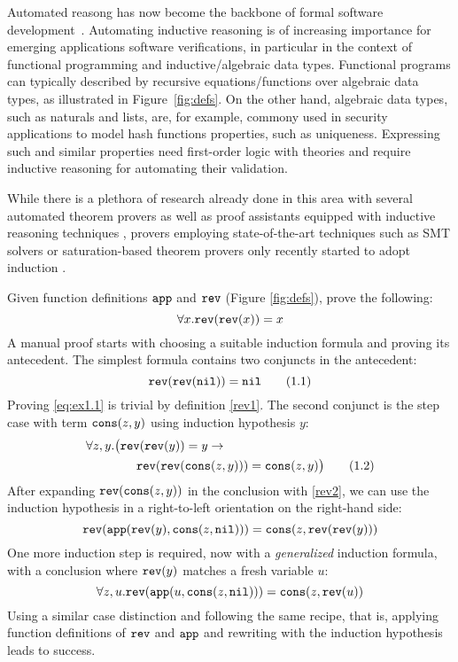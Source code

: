 Automated reasong has now become the backbone of formal software development~\cite{CAV18Cook}. Automating inductive reasoning is of increasing  importance for emerging applications software verifications, in particular in the context of functional programming and inductive/algebraic data types.
Functional programs can typically described by 
recursive equations/functions over algebraic data types, as illustrated in Figure~\ref{fig:defs}.  On the other hand, algebraic data types, such as naturals and lists, are, for example, commony used in security applications to model hash functions properties, such as uniqueness. Expressing such and similar properties need  first-order logic with theories and require inductive reasoning for automating their validation. 


While there is a plethora of research already done in this area \cite{bundychapter,mooreindutionhistory} with several automated theorem provers as well as proof assistants equipped with inductive reasoning techniques \cite{acl,aclhandbook,inka,oyster}, provers employing state-of-the-art techniques such as SMT solvers or saturation-based theorem provers only recently started to adopt induction \cite{cruanes,vampireinduction,smtinduction}. 

\begin{example}\label{ex:1}
Given function definitions $\mathtt{app}$ and $\mathtt{rev}$ (Figure \ref{fig:defs}), prove the following:
$$\forall x. \mathtt{rev}(\mathtt{rev}(x))=x$$
A manual proof starts with choosing a suitable induction formula and proving its antecedent. The simplest formula contains two conjuncts in the antecedent:
\begin{equation}\label{eq:ex1.1}\mathtt{rev}(\mathtt{rev}(\mathtt{nil})) = \mathtt{nil}\tag{1.1}\end{equation}
Proving \eqref{eq:ex1.1} is trivial by definition \eqref{rev1}. The second conjunct is the step case with term $\mathtt{cons}(z,y)$ using induction hypothesis $y$:
\begin{align}\forall z,y.\big(\mathtt{rev}(\mathtt{rev}(y))&=y\rightarrow\nonumber\\\mathtt{rev}(\mathtt{rev}(&\mathtt{cons}(z,y)))=\mathtt{cons}(z,y)\big)\label{eq:ex1.2}\tag{1.2}\end{align}
After expanding $\mathtt{rev}(\mathtt{cons}(z,y))$ in the conclusion with \eqref{rev2}, we can use the induction hypothesis in a right-to-left orientation on the right-hand side:
$$\mathtt{rev}(\mathtt{app}(\mathtt{rev}(y),\mathtt{cons}(z,\mathtt{nil})))=\mathtt{cons}(z,\mathtt{rev}(\mathtt{rev}(y)))$$
One more induction step is required, now with a \textit{generalized} induction formula, with a conclusion where $\mathtt{rev}(y)$ matches a fresh variable $u$:
$$\forall z,u.\mathtt{rev}(\mathtt{app}(u,\mathtt{cons}(z,\mathtt{nil})))=\mathtt{cons}(z,\mathtt{rev}(u))$$
Using a similar case distinction and following the same recipe, that is, applying function definitions of $\mathtt{rev}$ and $\mathtt{app}$ and rewriting with the induction hypothesis leads to success.
\end{example}


